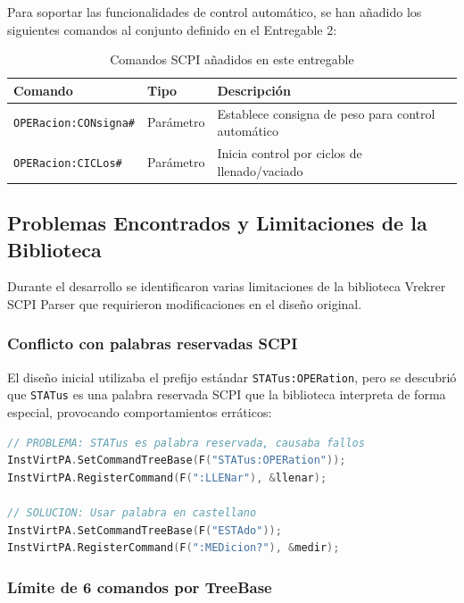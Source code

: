 \documentclass[12pt,a4paper]{article}
\begin{document}
Para soportar las funcionalidades de control automático, se han añadido los siguientes comandos al conjunto definido en el Entregable 2:

\begin{table}[H]
\centering
\caption{Comandos SCPI añadidos en este entregable}
\begin{tabular}{@{}llp{6cm}@{}}
\toprule
\textbf{Comando} & \textbf{Tipo} & \textbf{Descripción} \\
\midrule
\texttt{OPERacion:CONsigna\#} & Parámetro & Establece consigna de peso para control automático \\
\texttt{OPERacion:CICLos\#} & Parámetro & Inicia control por ciclos de llenado/vaciado \\
\bottomrule
\end{tabular}
\end{table}

\subsection{Problemas Encontrados y Limitaciones de la Biblioteca}

Durante el desarrollo se identificaron varias limitaciones de la biblioteca Vrekrer SCPI Parser que requirieron modificaciones en el diseño original.

\subsubsection{Conflicto con palabras reservadas SCPI}

El diseño inicial utilizaba el prefijo estándar \texttt{STATus:OPERation}, pero se descubrió que \texttt{STATus} es una palabra reservada SCPI que la biblioteca interpreta de forma especial, provocando comportamientos erráticos:

\begin{lstlisting}[language=C++, caption=Configuración problemática vs. corregida]
// PROBLEMA: STATus es palabra reservada, causaba fallos
InstVirtPA.SetCommandTreeBase(F("STATus:OPERation"));
InstVirtPA.RegisterCommand(F(":LLENar"), &llenar);

// SOLUCION: Usar palabra en castellano
InstVirtPA.SetCommandTreeBase(F("ESTAdo"));
InstVirtPA.RegisterCommand(F(":MEDicion?"), &medir);
\end{lstlisting}

\subsubsection{Límite de 6 comandos por TreeBase}
\end{document}
